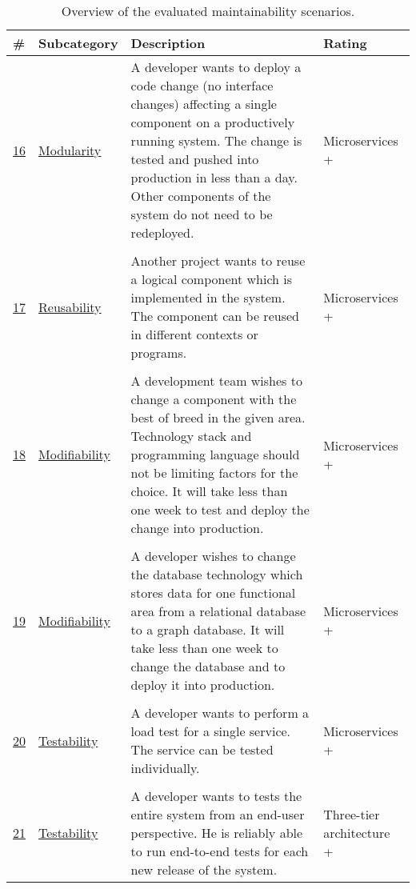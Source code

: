 \begin{table}[H]
  \renewcommand{\arraystretch}{1.2}
  \centering
  \sffamily
  \begin{footnotesize}
    \begin{tabular}{l l p{} p{}}
    \toprule
    \textbf{\#} & \textbf{Subcategory} & \textbf{Description}& \textbf{Rating} \\
    \midrule
    \hyperref[quaMicro:s16]{16} & \hyperref[quaMicro:s16]{Modularity} & A developer wants to deploy a code change (no interface changes) affecting a single component on a productively running system. The change is tested and pushed into production in less than a day. Other components of the system do not need to be redeployed.
 & Microservices + \\  \\
     \hyperref[quaMicro:s17]{17} & \hyperref[quaMicro:s17]{Reusability} & Another project wants to reuse a logical component which is implemented in the system. The component can be reused in different contexts or programs.
 & Microservices + \\  \\
      \hyperref[quaMicro:s18]{18} & \hyperref[quaMicro:s18]{Modifiability} & A development team wishes to change a component with the best of breed in the given area. Technology stack and programming language should not be limiting factors for the choice. It will take less than one week to test and deploy the change into production.
 & Microservices + \\  \\
       \hyperref[quaMicro:s19]{19} & \hyperref[quaMicro:s19]{Modifiability} & A developer wishes to change the database technology which stores data for one functional area from a relational database to a graph database. It will take less than one week to change the database and to deploy it into production. & Microservices + \\  \\
       \hyperref[quaMicro:s20]{20} & \hyperref[quaMicro:s20]{Testability} & A developer wants to perform a load test for a single service. The service can be tested individually. & Microservices + \\  \\ 
       \hyperref[quaMicro:s21]{21} & \hyperref[quaMicro:s21]{Testability} & A developer wants to tests the entire system from an end-user perspective. He is reliably able to run end-to-end tests for each new release of the system. & Three-tier architecture + \\ 
   \bottomrule
    \end{tabular}
  \end{footnotesize}
  \rmfamily
  \caption[Overview of the evaluated maintainability scenarios.]{Overview of the evaluated maintainability scenarios.}
  \label{quaMicro:tableOverview}
\end{table}

